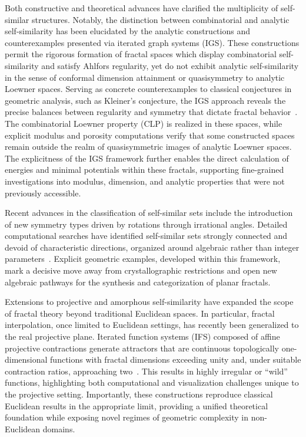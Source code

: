 \documentclass[sigconf]{acmart}
\begin{document}
Both constructive and theoretical advances have clarified the multiplicity of self-similar structures. Notably, the distinction between combinatorial and analytic self-similarity has been elucidated by the analytic constructions and counterexamples presented via iterated graph systems (IGS). These constructions permit the rigorous formation of fractal spaces which display combinatorial self-similarity and satisfy Ahlfors regularity, yet do not exhibit analytic self-similarity in the sense of conformal dimension attainment or quasisymmetry to analytic Loewner spaces. Serving as concrete counterexamples to classical conjectures in geometric analysis, such as Kleiner's conjecture, the IGS approach reveals the precise balances between regularity and symmetry that dictate fractal behavior~\cite{ref11}. The combinatorial Loewner property (CLP) is realized in these spaces, while explicit modulus and porosity computations verify that some constructed spaces remain outside the realm of quasisymmetric images of analytic Loewner spaces. The explicitness of the IGS framework further enables the direct calculation of energies and minimal potentials within these fractals, supporting fine-grained investigations into modulus, dimension, and analytic properties that were not previously accessible.

Recent advances in the classification of self-similar sets include the introduction of new symmetry types driven by rotations through irrational angles. Detailed computational searches have identified self-similar sets strongly connected and devoid of characteristic directions, organized around algebraic rather than integer parameters~\cite{ref31}. Explicit geometric examples, developed within this framework, mark a decisive move away from crystallographic restrictions and open new algebraic pathways for the synthesis and categorization of planar fractals.

Extensions to projective and amorphous self-similarity have expanded the scope of fractal theory beyond traditional Euclidean spaces. In particular, fractal interpolation, once limited to Euclidean settings, has recently been generalized to the real projective plane. Iterated function systems (IFS) composed of affine projective contractions generate attractors that are continuous topologically one-dimensional functions with fractal dimensions exceeding unity and, under suitable contraction ratios, approaching two~\cite{ref33}. This results in highly irregular or ``wild'' functions, highlighting both computational and visualization challenges unique to the projective setting. Importantly, these constructions reproduce classical Euclidean results in the appropriate limit, providing a unified theoretical foundation while exposing novel regimes of geometric complexity in non-Euclidean domains.
\end{document}
